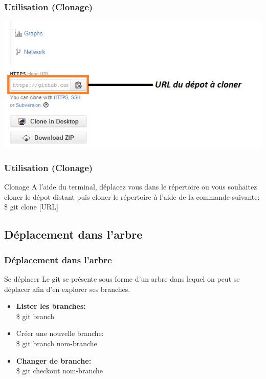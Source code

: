 \documentclass{beamer}
\begin{document}

\begin{frame}
\frametitle{Utilisation (Clonage)}
\includegraphics[scale=0.6]{URLdepot.png}
\end{frame}


\begin{frame}
\frametitle{Utilisation (Clonage)}
\begin{block}{Clonage}
A l'aide du terminal, d\'{e}placez vous dans le r\'{e}pertoire ou vous souhaitez cloner le d\'{e}pot distant puis cloner le r\'{e}pertoire \`{a} l'aide de la commande suivante:\\
\$ git clone [URL]
\end{block}
\end{frame}


\subsection{D\'{e}placement dans l'arbre}
\begin{frame}
\frametitle{D\'{e}placement dans l'arbre}
\begin{block}{Se d\'{e}placer}
Le git se pr\'{e}sente sous forme d'un arbre dans lequel on peut se d\'{e}placer afin d'en explorer ses branches.
\begin{itemize}
\item \textbf{Lister les branches:} \\
\$ git branch
\item Cr\'{e}er une nouvelle branche: \\
\$ git branch nom-branche
\item \textbf{Changer de branche:} \\
\$ git checkout nom-branche
\end{itemize}
\end{block}
\end{frame}
\end{document}
